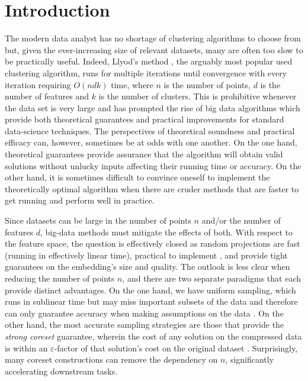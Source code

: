 \section{Introduction}

The modern data analyst has no shortage of clustering algorithms to choose from but, given the ever-increasing size of relevant datasets, many are often
too slow to be practically useful. 
Indeed, Llyod's method \cite{Lloyd82}, the arguably most popular used clustering algorithm, runs for multiple iterations until convergence with every iteration requiring $O(ndk)$ time, where $n$ is the number of points, $d$ is the number of features and $k$ is the number of clusters. This is prohibitive whenever the data set is very large and has prompted the rise of big data algorithms which provide both theoretical guarantees and
practical improvements for standard data-science techniques. The perspectives
of theoretical soundness and practical efficacy can, however, sometimes be at odds with one another. On the one hand, theoretical guarantees provide assurance that
the algorithm will obtain valid solutions without unlucky inputs affecting their running time or accuracy. On the other hand, it is sometimes difficult to convince
oneself to implement the theoretically optimal algorithm when there are cruder methods that are faster to get running and perform well in practice.

Since datasets can be large in the number of points $n$ and/or the number of features $d$, big-data methods must mitigate the effects of both.
With respect to the feature space, the question is effectively closed as random projections are fast (running in effectively linear time), practical to
implement \cite{makarychev2019performance}, and provide tight guarantees on the embedding's size and quality. The outlook is less clear when reducing the number of points $n$, and there are
two separate paradigms that each provide distinct advantages. 
On the one hand, we have uniform sampling, which runs in sublinear time but may miss important subsets of
the data and therefore can only guarantee accuracy when making assumptions on the data \cite{HuangJL23}.  On the other hand, the most accurate sampling strategies are those that provide the \emph{strong coreset}
guarantee, wherein the cost of any solution on the compressed data is within an $\varepsilon$-factor of that solution's cost on the original dataset \cite{stoc21}.
Surprisingly, many coreset constructions can remove the dependency on $n$, significantly accelerating downstream tasks.


